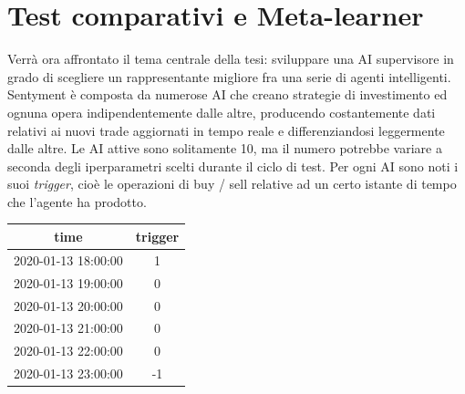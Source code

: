 \documentclass[a4paper,12pt]{report}
\begin{document}
\section{Test comparativi e Meta-learner}
Verrà ora affrontato il tema centrale della tesi: sviluppare una AI supervisore in grado di scegliere un rappresentante migliore fra una serie di agenti intelligenti.\\
Sentyment è composta da numerose AI che creano strategie di investimento ed ognuna opera indipendentemente dalle altre, producendo costantemente dati relativi ai nuovi trade aggiornati in tempo reale e differenziandosi leggermente dalle altre. Le AI attive sono solitamente 10, ma il numero potrebbe variare a seconda degli iperparametri scelti durante il ciclo di test. Per ogni AI sono noti i suoi \textit{trigger}, cioè le operazioni di buy / sell relative ad un certo istante di tempo che l'agente ha prodotto.\\
\begin{fig}
    \begin{center}
    	\begin{tabular}{||c c ||} 
    		\hline
    		time & trigger \\ [0.5ex] 
    		\hline\hline
    		2020-01-13 18:00:00 & 1 \\
    		\hline
    		2020-01-13 19:00:00 & 0 \\
    		\hline
    		2020-01-13 20:00:00 & 0 \\
    		\hline
    		2020-01-13 21:00:00 & 0 \\
    		\hline
    		2020-01-13 22:00:00 & 0 \\
    		\hline
    		2020-01-13 23:00:00 & -1 \\ [1ex] 
    		\hline
    	\end{tabular}
    \end{center}
	\label{Tabella 2}
\end{fig}
\\
\end{document}
